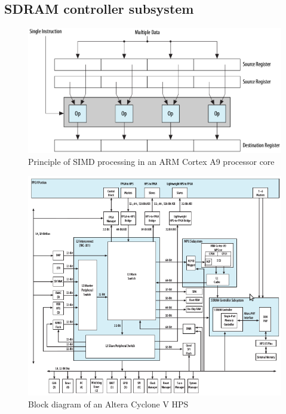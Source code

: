 \subsection{SDRAM controller subsystem}
\begin{figure}[htbp]
\begin{center}
\includegraphics[width=12cm,keepaspectratio=true]{bilder/png/SIMD}
\caption{Principle of SIMD processing in an ARM Cortex A9 processor core\cite[chapter 9]{AlteraHPS15}}
\label{fig:alterahpsblocks}
\end{center}
\end{figure}
\begin{figure}[htbp]
\begin{center}
\includegraphics[width=15cm,keepaspectratio=true]{bilder/png/AlteraHPS}
\caption{Block diagram of an Altera Cyclone V HPS\cite[chapter 1]{AlteraHPS15}}
\label{fig:alterahpsblocks}
\end{center}
\end{figure}

